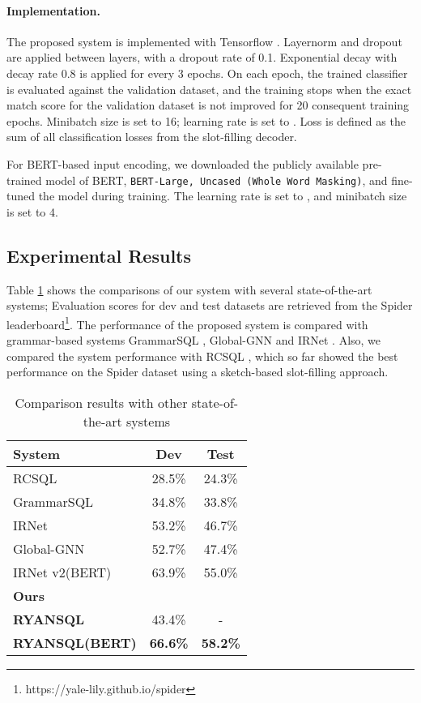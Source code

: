 \documentclass[11pt,a4paper]{article}
\begin{document}
\paragraph{Implementation.}
The proposed system is implemented with Tensorflow \citep{tensorflow2015-whitepaper}. Layernorm \citep{layernorm} and dropout \citep{dropout} are applied between layers, with a dropout rate of 0.1. Exponential decay with decay rate 0.8 is applied for every 3 epochs. On each epoch, the trained classifier is evaluated against the validation dataset, and the training stops when the exact match score for the validation dataset is not improved for 20 consequent training epochs. Minibatch size is set to 16; learning rate is set to . Loss is defined as the sum of all classification losses from the slot-filling decoder.

For BERT-based input encoding, we downloaded the publicly available pre-trained model of BERT, \texttt{BERT-Large, Uncased (Whole Word Masking)}, and fine-tuned the model during training. The learning rate is set to , and minibatch size is set to 4.

\subsection{Experimental Results}

Table \ref{tbl:eval} shows the comparisons of our system with several state-of-the-art systems; Evaluation scores for dev and test datasets are retrieved from the Spider leaderboard\footnote{https://yale-lily.github.io/spider}. The performance of the proposed system is compared with grammar-based systems GrammarSQL \citep{grammarsql}, Global-GNN \citep{gnn} and IRNet \citep{irnet}. Also, we compared the system performance with RCSQL \citep{rcsql}, which so far showed the best performance on the Spider dataset using a sketch-based slot-filling approach.

\begin{table}
\centering
\begin{tabular}{|l|c|c|} \hline
\textbf{System}&\textbf{Dev}&\textbf{Test} \\ \hline
RCSQL & 28.5\% & 24.3\% \\
GrammarSQL & 34.8\% & 33.8\% \\
IRNet&53.2\%&46.7\% \\ 
Global-GNN&52.7\%&47.4\% \\
IRNet v2(BERT)&63.9\%&55.0\% \\ \hline
\textbf{Ours}&& \\
\textbf{RYANSQL}&43.4\%&- \\
\textbf{RYANSQL(BERT)}&\textbf{66.6\%}&\textbf{58.2\%} \\ \hline
\end{tabular}
\caption{Comparison results with other state-of-the-art systems}
\label{tbl:eval}
\end{table}
\end{document}
